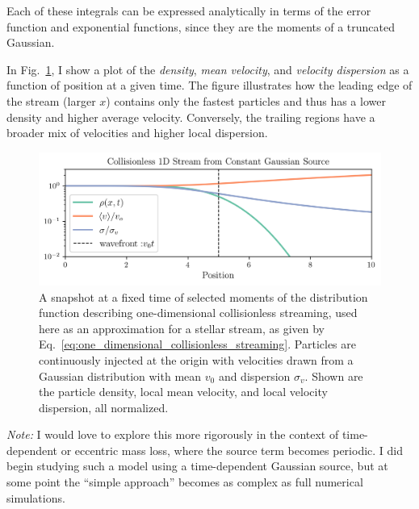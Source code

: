             Each of these integrals can be expressed analytically in terms of the error function and exponential functions, since they are the moments of a truncated Gaussian.


            In Fig.~\ref{fig:collisionless_1D_stream}, I show a plot of the \textit{density}, \textit{mean velocity}, and \textit{velocity dispersion} as a function of position at a given time. The figure illustrates how the leading edge of the stream (larger \( x \)) contains only the fastest particles and thus has a lower density and higher average velocity. Conversely, the trailing regions have a broader mix of velocities and higher local dispersion.
            
            \begin{figure}
                \centering
                \includegraphics[width=\linewidth]{images/collisionless_1D_stream.png}
                \caption{A snapshot at a fixed time of selected moments of the distribution function describing one-dimensional collisionless streaming, used here as an approximation for a stellar stream, as given by Eq.~\ref{eq:one_dimensional_collisionless_streaming}. Particles are continuously injected at the origin with velocities drawn from a Gaussian distribution with mean $v_0 $ and dispersion $ \sigma_v$. Shown are the particle density, local mean velocity, and local velocity dispersion, all normalized. }
                \label{fig:collisionless_1D_stream}
            \end{figure}


            \textit{Note:} I would love to explore this more rigorously in the context of time-dependent or eccentric mass loss, where the source term becomes periodic. I did begin studying such a model using a time-dependent Gaussian source, but at some point the ``simple approach'' becomes as complex as full numerical simulations. 

            






